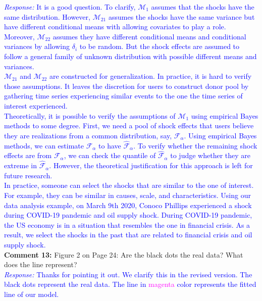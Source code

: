 \documentclass[12pt]{article}
\newcommand{\response}[1]{\noindent \textcolor{blue}{\emph{Response:} #1}}
\begin{document}
\response{It is a good question. To clarify, $\mathcal{M}_1$ assumes that the shocks have the same distribution. However, $\mathcal{M}_{21}$ assumes the shocks have the same variance but have different conditional means with allowing covariates to play a role. Moreover, $\mathcal{M}_{22}$ assumes they have different conditional means and conditional variances by allowing $\delta_i$ to be random. But the shock effects are assumed to follow a general family of  unknown distribution with possible different means and variances.\\

$\mathcal{M}_{21}$ and $\mathcal{M}_{22}$ are constructed for generalization. In practice, it is hard to verify those assumptions. It leaves the discretion for users to construct donor pool by gathering time series experiencing similar events to the one the time series of interest experienced. \\

Theoretically, it is possible to verify the assumptions of $\mathcal{M}_{1}$ using empirical Bayes methods to some degree. First, we need a  pool of shock effects that users believe they are realizations from a common distribution, say, $\mathcal{F}_{\alpha}$. Using empirical Bayes methods, we can estimate $\mathcal{F}_{\alpha}$ to have $\hat{\mathcal{F}}_{\alpha}$. To verify whether the remaining shock effects are from $\mathcal{F}_{\alpha}$, we can check the quantile of $\hat{\mathcal{F}}_{\alpha}$ to judge whether they are extreme in $\hat{\mathcal{F}}_{\alpha}$. However, the theoretical justification for this approach is left for future research. \\

In practice, someone can select the shocks that are similar to the one of interest. For example, they can be similar in causes, scale, and characteristics. Using our data analysis example, on March 9th 2020, Conoco Phillips experienced a shock during COVID-19 pandemic and oil supply shock. During COVID-19 pandemic, the US economy is in a situation that resembles the one in financial crisis. As a result, we select the shocks in the past that are related to financial crisis and oil supply shock.} \\


{\bf Comment 13:} Figure 2 on Page 24: Are the black dots the real data? What does the line represent?\\

\response{Thanks for pointing it out. We  clarify this in the revised version. The black dots represent the real data. The line in \textcolor{magenta}{magenta} color represents the fitted line of our model.}
\end{document}
